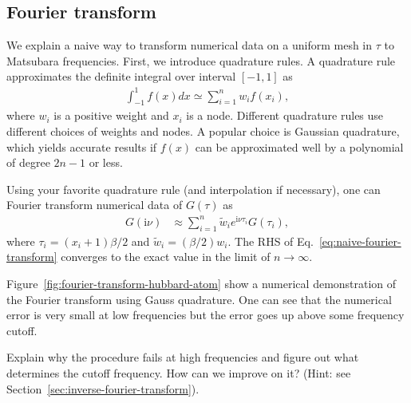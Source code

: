 \documentclass[submission, LectureNotes]{SciPost}
\newcommand\ii{\mathrm{i}}%
\newcommand\iv{\ii\nu}%
\begin{document}
%

\subsection{Fourier transform}
We explain a naive way to transform numerical data on a uniform mesh in $\tau$ to Matsubara frequencies.
First, we introduce quadrature rules.
A quadrature rule approximates the definite integral over interval $[-1,1]$ as
\begin{align}
   \int_{-1}^1 f(x) dx \simeq \sum_{i=1}^n w_i f(x_i),
\end{align}
where $w_i$ is a positive weight and $x_i$ is a node.
Different quadrature rules use different choices of weights and nodes.
A popular choice is Gaussian quadrature, which yields accurate results if $f(x)$ can be approximated 
well by a polynomial of degree $2n-1$ or less.

Using your favorite quadrature rule (and interpolation if necessary),
one can Fourier transform numerical data of $G(\tau)$ as
\begin{align}
   G(\iv) &\approx \sum_{i=1}^{n} \tilde{w}_i e^{\iv \tau_i} G(\tau_i),\label{eq:naive-fourier-transform}
\end{align}
where $\tau_i = (x_i+1)\beta/2$ and $\tilde{w}_i=(\beta/2) w_i$.
The RHS of Eq.~\eqref{eq:naive-fourier-transform} converges to the exact value in the limit of $n \rightarrow \infty$.

Figure~\ref{fig:fourier-transform-hubbard-atom} show a numerical demonstration of the Fourier transform using Gauss quadrature.
One can see that the numerical error is very small at low frequencies but the error goes up above some frequency cutoff.

\begin{Exercise}
    Explain why the procedure fails at high frequencies and 
    figure out what determines the cutoff frequency.
    How can we improve on it? (Hint: see Section~\ref{sec:inverse-fourier-transform}).
\end{Exercise}
\end{document}
